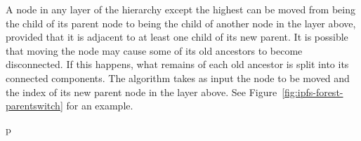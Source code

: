 A node in any layer of the hierarchy except the highest can be moved from being the child of its parent node to being the child of another node in the layer above, provided that it is adjacent to at least one child of its new parent. It is possible that moving the node may cause some of its old ancestors to become disconnected. If this happens, what remains of each old ancestor is split into its connected components. The algorithm takes as input the node to be moved and the index of its new parent node in the layer above. See Figure~\ref{fig:ipfs-forest-parentswitch} for an example.

\begin{stusubfig}{p}
	\hspace{4mm}%
	\hspace{4mm}%
	\\

\end{stusubfig}
